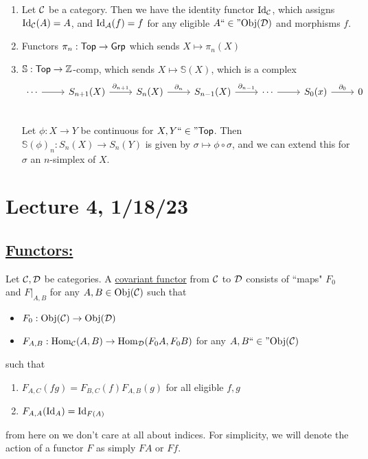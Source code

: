 \documentclass[x11names,reqno,14pt]{extarticle}
\newcommand{\fin}{``\in"}
\begin{document}
\exm

\begin{enumerate}

\item Let $\mathcal{C}$ be a category. Then we have the identity functor $\operatorname{\mathrm{Id}}_{\mathcal{C}}$, which assigns $\operatorname{\mathrm{Id}}_{\mathcal{C}}(A) = A$, and $\operatorname{\mathrm{Id}}_{\mathcal{A}}(f) = f$ for any eligible $A \fin\Obj(\mc{D})$ and morphisms $f$. 

\item Functors $\pi_n:{{\text{\sffamily {Top}}}}\to{{\text{\sffamily {Grp}}}}$ which sends $X\mapsto\pi_n(X)$

\item $\mathbb{S}:{{\text{\sffamily {Top}}}}\to\mathbb{Z}$-comp, which sends $X\mapsto \mathbb{S}(X)$, which is a complex
\[
\begin{tikzcd}
\cdots \ar[r]&   S_{n + 1}(X)  \ar[r, "\del_{n + 1}"] &  S_n(X) \ar[r, "\del_n"]& S_{n - 1}(X) \ar[r, "\del_{n - 1}"] &\cdots \ar[r] &\ar[r,"\del_0"] S_0(x) & 0\\ 
\end{tikzcd}
\]
Let $\phi:X\to Y$ be continuous for $X, Y \fin \Top$. Then $\mathbb{S}(\phi)_n:S_n(X)\to S_n(Y)$ is given by $\sigma\mapsto\phi\circ\sigma$, and we can extend this for $\sigma$ an $n$-simplex of $X$. 

\end{enumerate}

\section*{Lecture 4, 1/18/23}

\subsection*{\underline{Functors:}}
Let $\mathcal{C}, \mathcal{D}$ be categories. A \underline{covariant functor} from $\mathcal{C}$ to $\mathcal{D}$ consists of ``maps" $F_0$ and $F|_{A, B}$ for any $A, B \in {\mathrm{Obj}}(\mathcal{C})$ such that
\begin{itemize}
\item $F_0:{\mathrm{Obj}}(\mathcal{C})\to{\mathrm{Obj}}(\mathcal{D})$
\item $F_{A, B}:{\mathrm{Hom}}_{\mathcal{C}}(A, B)\to {\mathrm{Hom}}_{\mathcal{D}}(F_0A,F_0B)$ for any $A, B \fin \Obj(\mc{C})$
\end{itemize}
such that 
\begin{enumerate}[label=(\alph*)]
\item $F_{A, C}(fg) = F_{B, C}(f)F_{A, B}(g)$ for all eligible $f, g$ 
\item $F_{A, A}(\operatorname{\mathrm{Id}}_A) = \operatorname{\mathrm{Id}}_{F(A)}$
\end{enumerate}
from here on we don't care at all about indices. For simplicity, we will denote the action of a functor $F$ as simply $FA$ or $Ff$. 
\end{document}
